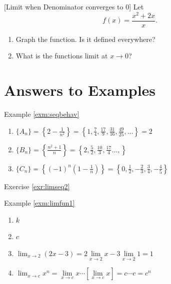 \documentclass[]{book}
\providecommand{\tightlist}{%
  \setlength{\itemsep}{0pt}\setlength{\parskip}{0pt}}
\theoremstyle{definition}
\theoremstyle{definition}
\theoremstyle{definition}
\theoremstyle{remark}
\begin{document}
[Limit when Denominator converges to 0]
\protect\hypertarget{exr:discontdraw}{}{\label{exr:discontdraw} {} }
Let \[f(x) = \frac{x^2 + 2x}{x}.\]

\begin{enumerate}
\def\labelenumi{\arabic{enumi}.}
\tightlist
\item
  Graph the function. Is it defined everywhere?
\item
  What is the functions limit at \(x \rightarrow 0\)?
\end{enumerate}

\hypertarget{answers-to-examples}{%
\section*{Answers to Examples}\label{answers-to-examples}}

Example \ref{exm:seqbehav}

{}

\begin{enumerate}
\def\labelenumi{\arabic{enumi}.}
\tightlist
\item
  \(\{A_n\}=\left\{ 2-\frac{1}{n^2} \right\} = \left\{1, \frac{7}{4}, \frac{17}{9}, \frac{31}{16}, \frac{49}{25}, \ldots\right\} = 2\)
\item
  \(\{B_n\}=\left\{\frac{n^2+1}{n} \right\} = \left\{2, \frac{5}{2}, \frac{10}{3}, \frac{17}{4}..., \right\}\)
\item
  \(\{C_n\}=\left\{(-1)^n \left(1-\frac{1}{n}\right) \right\} = \left\{0, \frac{1}{2}, -\frac{2}{3}, \frac{3}{4}, -\frac{4}{5}\right\}\)
\end{enumerate}

Exercise \ref{exr:limseq2}

Example \ref{exm:limfun1}

{}

\begin{enumerate}
\def\labelenumi{\arabic{enumi}.}
\tightlist
\item
  \(k\)
\item
  \(c\)
\item
  \(\lim_{x\to 2} (2x-3) = 2\lim\limits_{x\to 2} x - 3\lim\limits_{x\to 2} 1 = 1\)
\item
  \(\lim_{x \to c} x^n = \lim\limits_{x \to c} x \cdots[\lim\limits_{x \to c} x] = c\cdots c =c^n\)
\end{enumerate}
\end{document}

